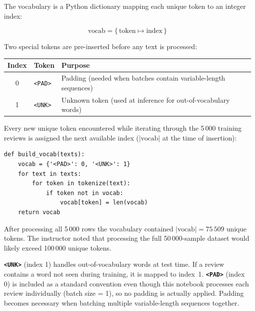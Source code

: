 \documentclass[12pt,a4paper]{article}
\begin{document}
The vocabulary is a Python dictionary mapping each unique token to an
integer index:

\begin{equation}
  \text{vocab} = \bigl\{\,\text{token} \mapsto \text{index}\,\bigr\}
  \label{eq:vocab}
\end{equation}

Two special tokens are pre-inserted before any text is processed:

\begin{center}
  \begin{tabular}{cll}
    \toprule
    \textbf{Index} & \textbf{Token} & \textbf{Purpose} \\
    \midrule
    0 & \texttt{<PAD>} & Padding (needed when batches contain variable-length sequences) \\
    1 & \texttt{<UNK>} & Unknown token (used at inference for out-of-vocabulary words) \\
    \bottomrule
  \end{tabular}
\end{center}

Every new unique token encountered while iterating through the 5\,000
training reviews is assigned the next available index
($|\text{vocab}|$ at the time of insertion):

\begin{verbatim}
def build_vocab(texts):
    vocab = {'<PAD>': 0, '<UNK>': 1}
    for text in texts:
        for token in tokenize(text):
            if token not in vocab:
                vocab[token] = len(vocab)
    return vocab
\end{verbatim}

After processing all 5\,000 rows the vocabulary contained
$|\text{vocab}| = 75\,509$ unique tokens.  The instructor noted that
processing the full 50\,000-sample dataset would likely exceed
100\,000 unique tokens.

\begin{keyinsight}[title=Why Both \texttt{<PAD>} and \texttt{<UNK>}?]
  \textbf{\texttt{<UNK>}} (index 1) handles out-of-vocabulary words at
  test time.  If a review contains a word not seen during training, it
  is mapped to index~1.  \textbf{\texttt{<PAD>}} (index 0) is included
  as a standard convention even though this notebook processes each
  review individually (batch size = 1), so no padding is actually
  applied.  Padding becomes necessary when batching multiple
  variable-length sequences together.
\end{keyinsight}
\end{document}
